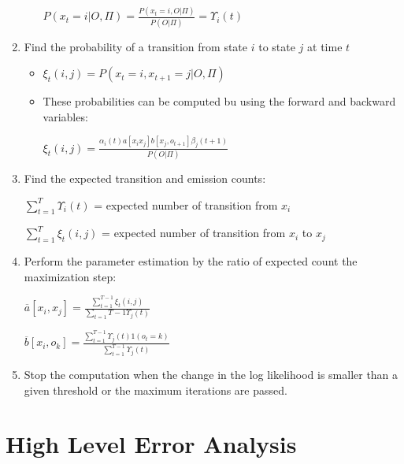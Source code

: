 \begin{enumerate}
\begin{itemize}
$P(x_t = i | O, \Pi) = \frac{P(x_t = i, O | \Pi)}{P(O | \Pi)} = \Upsilon_{i}(t)$

\end{itemize}
\item Find the probability of a transition from state $i$ to state $j$ at time $t$

\begin{itemize}
\item $\xi_{t}(i,j) = P (x_t = i,x_{t + 1} = j | O, \Pi)$


\item These probabilities can be computed bu using the forward and backward variables:

$\xi_{t}(i,j) = \frac{\alpha_i (t) a[x_i x_j] b[x_j,o_{t + 1}] \beta_j (t + 1)   }{P(O | \Pi)}$

\end{itemize}
\item Find the expected transition and emission counts:

$\sum\limits_{t = 1}^{ T } \Upsilon_i (t)$ = expected number of transition from $x_i$

$\sum\limits_{t = 1}^{ T} \xi_t (i ,j)$ = expected number of transition from $x_i$ to $x_j$

\item Perform the parameter estimation by the ratio of expected count the maximization step:


$\overline{a}[x_i, x_j] = \frac{\sum\limits_{t = 1}^{T - 1}\xi_{t} (i, j)}{\sum\limits_{t = 1} T - 1 \Upsilon_{j}(t)} $




$\overline{b}[x_i, o_k] = \frac{\sum\limits_{t = 1}^{T - 1}\Upsilon_{j} (t) 1 (o_t = k)}{\sum\limits_{t = 1}^{T - 1} \Upsilon_{j}(t)} $

\item Stop the computation when the change in the log likelihood is smaller than a given threshold or the maximum iterations are passed.

\end{enumerate} 














\section{High Level Error Analysis}







